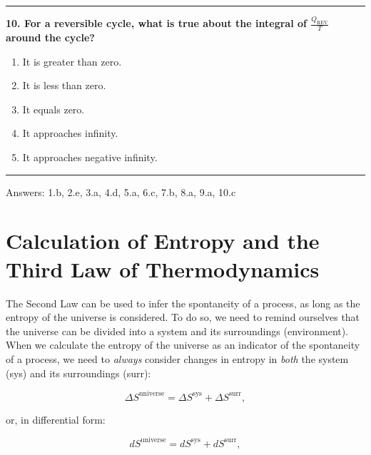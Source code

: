 \documentclass[
  9pt,
]{extbook}
\providecommand{\tightlist}{%
  \setlength{\itemsep}{0pt}\setlength{\parskip}{0pt}}
\theoremstyle{definition}
\theoremstyle{definition}
\theoremstyle{definition}
\theoremstyle{definition}
\theoremstyle{remark}
\begin{document}
\begin{center}\rule{0.5\linewidth}{0.5pt}\end{center}

\textbf{10. For a reversible cycle, what is true about the integral of \(\frac{Q_{\text{REV}}}{T}\) around the cycle?}

\begin{enumerate}
\def\labelenumi{\alph{enumi}.}
\tightlist
\item
  It is greater than zero.
\item
  It is less than zero.
\item
  It equals zero.
\item
  It approaches infinity.
\item
  It approaches negative infinity.
\end{enumerate}

\begin{center}\rule{0.5\linewidth}{0.5pt}\end{center}

Answers: 1.b, 2.e, 3.a, 4.d, 5.a, 6.c, 7.b, 8.a, 9.a, 10.c

\renewcommand*{\standardstate}{{-\kern-6pt{\ominus}\kern-6pt-}}

\chapter{Calculation of Entropy and the Third Law of Thermodynamics}\label{thirdlaw}

The Second Law can be used to infer the spontaneity of a process, as long as the entropy of the universe is considered. To do so, we need to remind ourselves that the universe can be divided into a system and its surroundings (environment). When we calculate the entropy of the universe as an indicator of the spontaneity of a process, we need to \emph{always} consider changes in entropy in \emph{both} the system (sys) and its surroundings (surr):

\begin{equation}
\Delta S^{\mathrm{universe}} = \Delta S^{\mathrm{sys}} + \Delta S^{\mathrm{surr}},
\label{eq:dsuniv}
\end{equation}

or, in differential form:

\begin{equation}
d S^{\mathrm{universe}} = d S^{\mathrm{sys}} + d S^{\mathrm{surr}},
\label{eq:dsunivd}
\end{equation}
\end{document}
